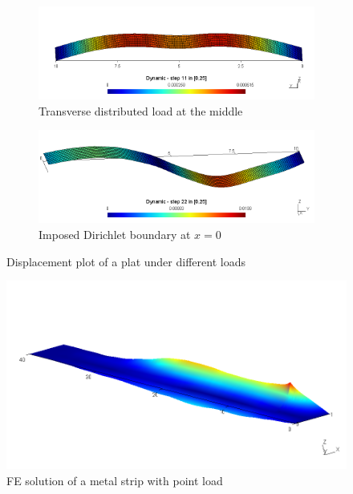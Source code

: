 \documentclass[main.tex]{subfiles}
\begin{document}
\begin{figure}[h!]\label{fig:res:FEMvsGAL}
\begin{subfigure}{.98\textwidth}
\includegraphics[width=\linewidth,trim={0cm 0 0cm 0},clip]{images/FvsD_F.png}
\caption{Transverse distributed load at the middle}
\end{subfigure} \vfill
\begin{subfigure}{.98\textwidth}
\includegraphics[width=\linewidth,trim={0cm 0 0cm 0},clip]{images/FvsD_D.png}
\caption{Imposed Dirichlet boundary at $x=0$}
\end{subfigure}

\caption{Displacement plot of a plat under different loads}
\end{figure}





\begin{figure}[h!]

\includegraphics[width=\linewidth,trim={1cm 0 1cm 0},clip]{images/FEMvsGAL.png}



\caption{FE solution of a metal strip with point load}
\end{figure}
\end{document}
